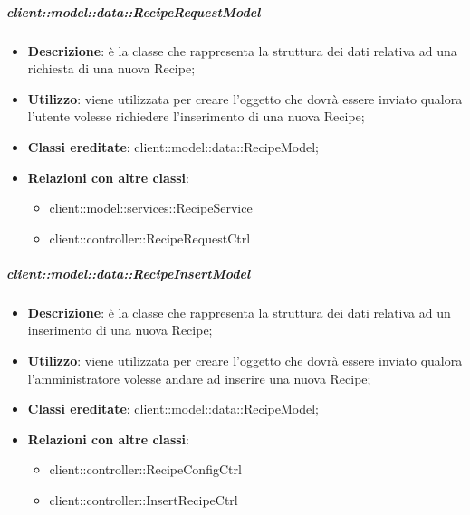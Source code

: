 
		\subparagraph{client::model::data::RecipeRequestModel} %
		\label{subp:client_model_data_reciperequestmodel}
			\begin{itemize}
				\item \textbf{Descrizione}: è la classe che rappresenta la struttura dei dati relativa ad una richiesta di una nuova Recipe;
				\item \textbf{Utilizzo}: viene utilizzata per creare l'oggetto che dovrà essere inviato qualora l'utente volesse richiedere l'inserimento di una nuova Recipe;
				\item \textbf{Classi ereditate}: client::model::data::RecipeModel;
				\item \textbf{Relazioni con altre classi}:
					\begin{itemize}
						\item client::model::services::RecipeService
						\item client::controller::RecipeRequestCtrl
					\end{itemize}
			\end{itemize}

		\subparagraph{client::model::data::RecipeInsertModel} %
		\label{subp:client_model_data_recipeinsertmodel}
			\begin{itemize}
				\item \textbf{Descrizione}: è la classe che rappresenta la struttura dei dati relativa ad un inserimento di una nuova Recipe;
				\item \textbf{Utilizzo}: viene utilizzata per creare l'oggetto che dovrà essere inviato qualora l'amministratore volesse andare ad inserire una nuova Recipe;
				\item \textbf{Classi ereditate}: client::model::data::RecipeModel;
				\item \textbf{Relazioni con altre classi}:
					\begin{itemize}
						\item client::controller::RecipeConfigCtrl
						\item client::controller::InsertRecipeCtrl
					\end{itemize}
			\end{itemize}

